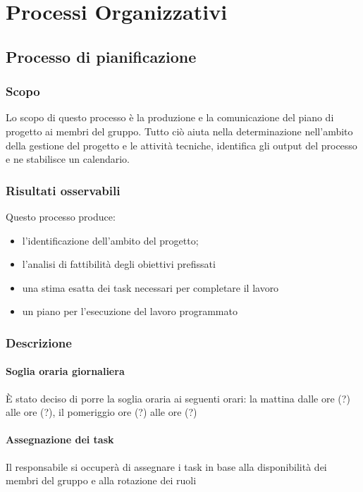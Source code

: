 \section{Processi Organizzativi}

\subsection{Processo di pianificazione}

\subsubsection{Scopo}

Lo scopo di questo processo è la produzione e la comunicazione del piano di progetto ai membri del gruppo. Tutto ciò aiuta nella determinazione nell'ambito della gestione del progetto e le attività tecniche, identifica gli output del processo e ne stabilisce un calendario.


\subsubsection{Risultati osservabili}

Questo processo produce:
\begin{itemize}

\item l'identificazione dell'ambito del progetto;
\item l'analisi di fattibilità degli obiettivi prefissati
\item una stima esatta dei task necessari per completare il lavoro
\item un piano per l'esecuzione del lavoro programmato

\end{itemize}

\subsubsection{Descrizione}

\paragraph*{Soglia oraria giornaliera}È stato deciso di porre la soglia oraria ai seguenti orari: la mattina dalle ore (?) alle ore (?), il pomeriggio  ore (?) alle ore (?) %

\paragraph*{Assegnazione dei task}Il responsabile si occuperà di assegnare i task in base alla disponibilità dei membri del gruppo e alla rotazione dei ruoli

